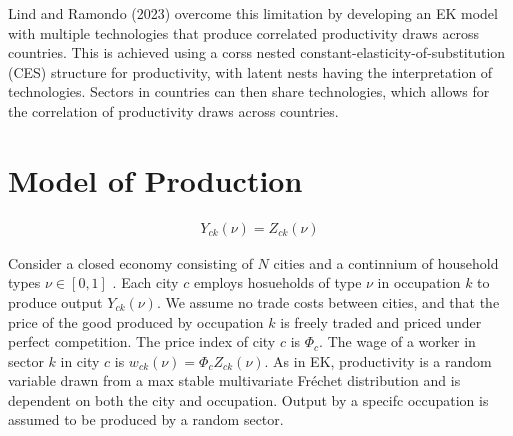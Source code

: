 \documentclass[10pt]{article}
\begin{document}
Lind and Ramondo (2023) overcome this limitation by developing an EK model with multiple technologies that produce correlated productivity draws across countries. This is achieved using a corss nested constant-elasticity-of-substitution (CES) structure for productivity, with latent nests having the interpretation of technologies. Sectors in countries can then share technologies, which allows for the correlation of productivity draws across countries.

\section{Model of Production}

\begin{align}
    Y_{ck} (\nu) = Z_{ck}(\nu)
\end{align}

Consider a closed economy consisting of $N$ cities and a continnium of household types $\nu \in [0, 1]$ . Each city $c$ employs hosueholds of type $\nu$ in occupation $k$ to produce output $Y_{ck}(\nu)$. We assume no trade costs between cities, and that the price of the good produced by occupation $k$ is freely traded and priced under perfect competition. The price index of city $c$ is $\Phi_c$. The wage of a worker in sector $k$ in city $c$ is $w_{ck}(\nu) = \Phi_c Z_{ck}(\nu)$. As in EK, productivity is a random variable drawn from a max stable multivariate Fréchet distribution and is dependent on both the city and occupation. Output by a specifc occupation is assumed to be produced by a random sector.




\end{document}
